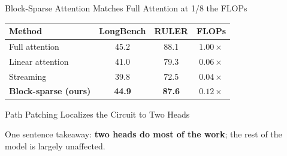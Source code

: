 \documentclass[aspectratio=169,11pt]{beamer}
\begin{document}
\begin{frame}{Block-Sparse Attention Matches Full Attention at 1/8 the FLOPs}
  \vspace{0.4em}
  \centering\small
  \begin{tabular}{lccc}
    \toprule
    \textbf{Method} & \textbf{LongBench} & \textbf{RULER} & \textbf{FLOPs} \\
    \midrule
    Full attention & 45.2 & 88.1 & $1.00\times$ \\
    Linear attention & 41.0 & 79.3 & $0.06\times$ \\
    Streaming & 39.8 & 72.5 & $0.04\times$ \\
    \textbf{Block-sparse (ours)} & {\color{aaclay}\bfseries 44.9} & {\color{aaclay}\bfseries 87.6} & {\color{aaclay}\bfseries $0.12\times$} \\
    \bottomrule
  \end{tabular}
\end{frame}

\begin{frame}{Path Patching Localizes the Circuit to Two Heads}
  \centering
  \par\vspace{0.4em}
  {\small One sentence takeaway: \textbf{two heads do most of the work}; the
   rest of the model is largely unaffected.\par}
\end{frame}
\end{document}
